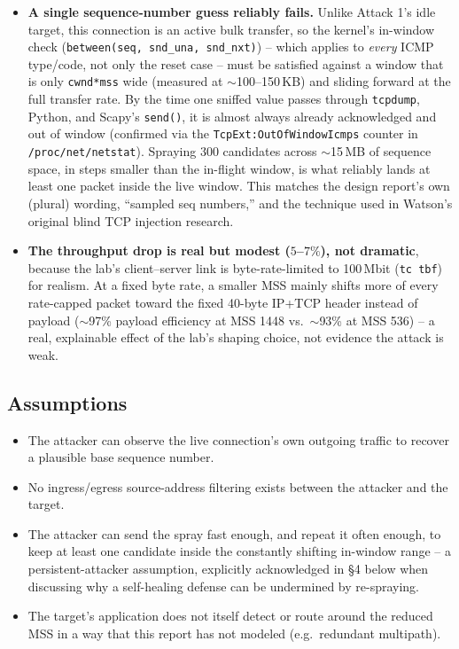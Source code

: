 \documentclass[11pt]{article}
\begin{document}
\begin{itemize}
    \item \textbf{A single sequence-number guess reliably fails.}
    Unlike Attack 1's idle target, this connection is an active bulk
    transfer, so the kernel's in-window check
    (\texttt{between(seq, snd\_una, snd\_nxt)}) -- which applies to
    \emph{every} ICMP type/code, not only the reset case -- must be
    satisfied against a window that is only \texttt{cwnd*mss} wide
    (measured at $\sim$100--150\,KB) and sliding forward at the full
    transfer rate. By the time one sniffed value passes through
    \texttt{tcpdump}, Python, and Scapy's \texttt{send()}, it is almost
    always already acknowledged and out of window (confirmed via the
    \texttt{TcpExt:OutOfWindowIcmps} counter in \texttt{/proc/net/netstat}).
    Spraying 300 candidates across $\sim$15\,MB of sequence space, in
    steps smaller than the in-flight window, is what reliably lands at
    least one packet inside the live window. This matches the design
    report's own (plural) wording, ``sampled seq numbers,'' and the
    technique used in Watson's original blind TCP injection research.
    \item \textbf{The throughput drop is real but modest ($5$--$7\%$),
    not dramatic}, because the lab's client--server link is
    byte-rate-limited to 100\,Mbit (\texttt{tc tbf}) for realism. At a
    fixed byte rate, a smaller MSS mainly shifts more of every
    rate-capped packet toward the fixed 40-byte IP+TCP header instead of
    payload ($\sim$97\% payload efficiency at MSS 1448 vs.\ $\sim$93\%
    at MSS 536) -- a real, explainable effect of the lab's shaping
    choice, not evidence the attack is weak.
\end{itemize}

\subsection{Assumptions}

\begin{itemize}
    \item The attacker can observe the live connection's own outgoing
    traffic to recover a plausible base sequence number.
    \item No ingress/egress source-address filtering exists between the
    attacker and the target.
    \item The attacker can send the spray fast enough, and repeat it
    often enough, to keep at least one candidate inside the constantly
    shifting in-window range -- a persistent-attacker assumption,
    explicitly acknowledged in \S 4 below when discussing why a
    self-healing defense can be undermined by re-spraying.
    \item The target's application does not itself detect or route
    around the reduced MSS in a way that this report has not modeled
    (e.g.\ redundant multipath).
\end{itemize}
\end{document}
